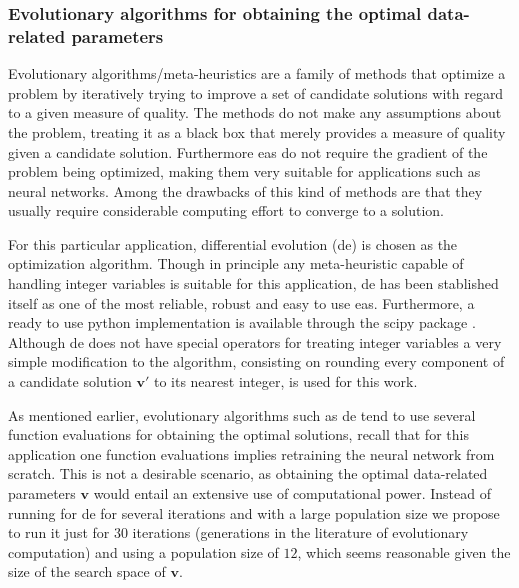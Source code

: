 \subsubsection{Evolutionary algorithms for obtaining the optimal data-related parameters}
\label{sec:ea_optimization_process}

Evolutionary algorithms/meta-heuristics are a family of methods that optimize a problem by iteratively trying to improve a set of candidate solutions with regard to a given measure of quality. The methods do not make any assumptions about the problem, treating it as a black box that merely provides a measure of quality given a candidate solution. Furthermore \glspl{ea} do not require the gradient of the problem being optimized, making them very suitable for applications such as neural networks. Among the drawbacks of this kind of methods are that they usually require considerable computing effort to converge to a solution.

For this particular application, differential evolution (\gls{de}) \citep{Storn1997} is chosen as the optimization algorithm. Though in principle any meta-heuristic capable of handling integer variables is suitable for this application, \gls{de} has been stablished itself as one of the most reliable, robust and easy to use \glspl{ea}. Furthermore, a ready to use python implementation is available through the scipy package \citep{scipy}. Although \gls{de} does not have special operators for treating integer variables a very simple modification to the algorithm, consisting on rounding every component of a candidate solution $\mathbf{v}'$ to its nearest integer, is used for this work.

As mentioned earlier, evolutionary algorithms such as \gls{de} tend to use several function evaluations for obtaining the optimal solutions, recall that for this application one function evaluations implies retraining the  neural network from scratch. This is not a desirable scenario, as obtaining the optimal data-related parameters $\mathbf{v}$ would entail an extensive use of computational power. Instead of running for \gls{de} for several iterations and with a large population size we propose to run it just for $30$ iterations (generations in the literature of evolutionary computation) and using a population size of $12$, which seems reasonable given the size of the search space of $\mathbf{v}$. 


